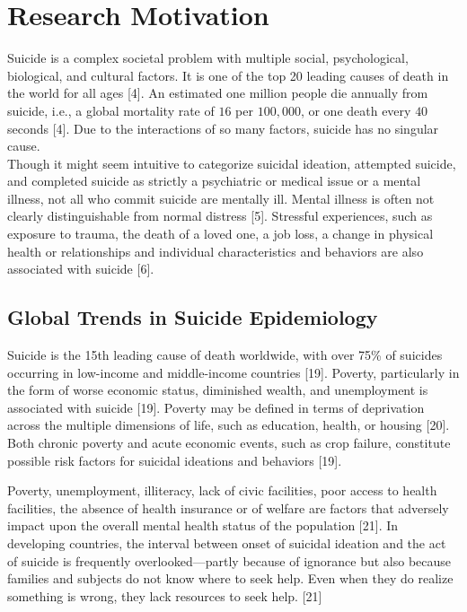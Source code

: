 \documentclass[]{article}
\begin{document}
\section{Research Motivation}\label{research-motivation}

Suicide is a complex societal problem with multiple social,
psychological, biological, and cultural factors. It is one of the top 20
leading causes of death in the world for all ages {[}4{]}. An estimated
one million people die annually from suicide, i.e., a global mortality
rate of \(16\) per \(100,000\), or one death every \(40\) seconds
{[}4{]}. Due to the interactions of so many factors, suicide has no
singular cause.\\
Though it might seem intuitive to categorize suicidal ideation,
attempted suicide, and completed suicide as strictly a psychiatric or
medical issue or a mental illness, not all who commit suicide are
mentally ill. Mental illness is often not clearly distinguishable from
normal distress {[}5{]}. Stressful experiences, such as exposure to
trauma, the death of a loved one, a job loss, a change in physical
health or relationships and individual characteristics and behaviors are
also associated with suicide {[}6{]}.

\subsection{Global Trends in Suicide
Epidemiology}\label{global-trends-in-suicide-epidemiology}

Suicide is the 15th leading cause of death worldwide, with over 75\% of
suicides occurring in low-income and middle-income countries {[}19{]}.
Poverty, particularly in the form of worse economic status, diminished
wealth, and unemployment is associated with suicide {[}19{]}. Poverty
may be defined in terms of deprivation across the multiple dimensions of
life, such as education, health, or housing {[}20{]}. Both chronic
poverty and acute economic events, such as crop failure, constitute
possible risk factors for suicidal ideations and behaviors {[}19{]}.

Poverty, unemployment, illiteracy, lack of civic facilities, poor access
to health facilities, the absence of health insurance or of welfare are
factors that adversely impact upon the overall mental health status of
the population {[}21{]}. In developing countries, the interval between
onset of suicidal ideation and the act of suicide is frequently
overlooked---partly because of ignorance but also because families and
subjects do not know where to seek help. Even when they do realize
something is wrong, they lack resources to seek help. {[}21{]}
\end{document}
